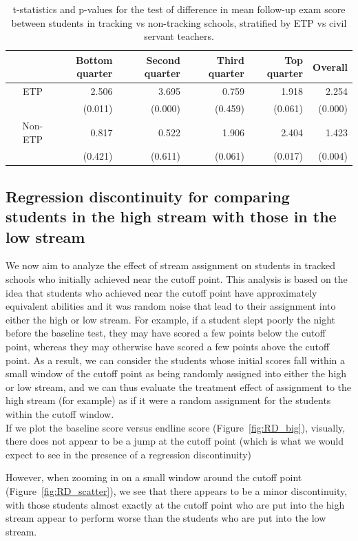 \documentclass[11pt]{article}
\begin{document}
\begin{table}[ht]
\centering
\begin{tabular}{rrrrrr}
  \hline
 & Bottom quarter & Second quarter & Third quarter & Top quarter & Overall \\ 
  \hline
  ETP & 2.506 & 3.695 & 0.759 & 1.918 & 2.254 \\ 
   & (0.011) & (0.000) & (0.459) & (0.061) & (0.000) \\ 
  Non-ETP & 0.817 & 0.522 & 1.906 & 2.404 & 1.423 \\ 
   & (0.421) & (0.611) & (0.061) & (0.017) & (0.004) \\ 
   \hline
\end{tabular}
\caption{t-statistics and p-values for the test of difference in mean follow-up exam score between students in tracking vs non-tracking schools, stratified by ETP vs civil servant teachers.} 
\end{table} %


 \subsection{Regression discontinuity for comparing students in the high stream with those in the low stream}
We now aim to analyze the effect of stream assignment on students in tracked schools who initially achieved near the cutoff point. This analysis is based on the idea that students who achieved near the cutoff point have approximately equivalent abilities and it was random noise that lead to their assignment into either the high or low stream. For example, if a student slept poorly the night before the baseline test, they may have scored a few points below the cutoff point, whereas they may otherwise have scored a few points above the cutoff point. As a result, we can consider the students whose initial scores fall within a small window of the cutoff point as being randomly assigned into either the high or low stream, and we can thus evaluate the treatment effect of assignment to the high stream (for example) as if it were a random assignment for the students within the cutoff window.\\
If we plot the baseline score versus endline score (Figure~\ref{fig:RD_big}), visually, there does not appear to be a jump at the cutoff point (which is what we would expect to see in the presence of a regression discontinuity)

However, when zooming in on a small window around the cutoff point (Figure~\ref{fig:RD_scatter}), we see that there appears to be a minor discontinuity, with those students almost exactly at the cutoff point who are put into the high stream appear to perform worse than the students who are put into the low stream.
\end{document}
